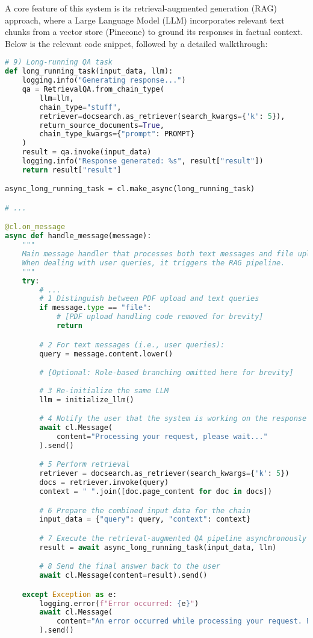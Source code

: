 A core feature of this system is its retrieval-augmented generation (RAG) approach, where a Large Language Model (LLM) incorporates relevant text chunks from a vector store (Pinecone) to ground its responses in factual context. Below is the relevant code snippet, followed by a detailed walkthrough:

\begin{lstlisting}[language=Python, caption={Retrieval-Augmented Generation (RAG) Pipeline}, basicstyle=\small\ttfamily]
# 9) Long-running QA task
def long_running_task(input_data, llm):
    logging.info("Generating response...")
    qa = RetrievalQA.from_chain_type(
        llm=llm,
        chain_type="stuff",
        retriever=docsearch.as_retriever(search_kwargs={'k': 5}),
        return_source_documents=True,
        chain_type_kwargs={"prompt": PROMPT}
    )
    result = qa.invoke(input_data)
    logging.info("Response generated: %s", result["result"])
    return result["result"]

async_long_running_task = cl.make_async(long_running_task)

# ...

@cl.on_message
async def handle_message(message):
    """
    Main message handler that processes both text messages and file uploads.
    When dealing with user queries, it triggers the RAG pipeline.
    """
    try:
        # ...
        # 1 Distinguish between PDF upload and text queries
        if message.type == "file":
            # [PDF upload handling code removed for brevity]
            return

        # 2 For text messages (i.e., user queries):
        query = message.content.lower()

        # [Optional: Role-based branching omitted here for brevity]
        
        # 3 Re-initialize the same LLM
        llm = initialize_llm()

        # 4 Notify the user that the system is working on the response
        await cl.Message(
            content="Processing your request, please wait..."
        ).send()

        # 5 Perform retrieval
        retriever = docsearch.as_retriever(search_kwargs={'k': 5})
        docs = retriever.invoke(query)
        context = " ".join([doc.page_content for doc in docs])

        # 6 Prepare the combined input data for the chain
        input_data = {"query": query, "context": context}

        # 7 Execute the retrieval-augmented QA pipeline asynchronously
        result = await async_long_running_task(input_data, llm)

        # 8 Send the final answer back to the user
        await cl.Message(content=result).send()

    except Exception as e:
        logging.error(f"Error occurred: {e}")
        await cl.Message(
            content="An error occurred while processing your request. Please try again."
        ).send()
\end{lstlisting}

